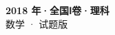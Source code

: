\documentclass[zihao=-4, a4paper]{ctexart}
\begin{document}
\begin{center}
  {\Large\bfseries 2018 年·全国Ⅰ卷·理科}\\[4pt]
  {\large 数学 · 试题版}
\end{center}
\medskip
{}

\end{document}
